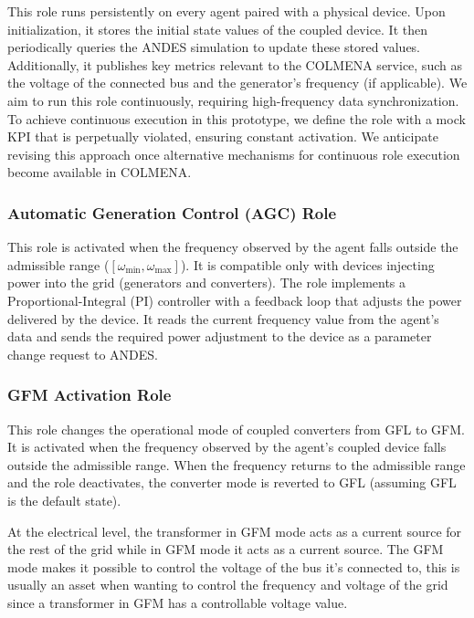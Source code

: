 \documentclass{article}
\begin{document}
This role runs persistently on every agent paired with a physical device. Upon initialization, it stores the initial state values of the coupled device. It then periodically queries the ANDES simulation to update these stored values. Additionally, it publishes key metrics relevant to the COLMENA service, such as the voltage of the connected bus and the generator's frequency (if applicable). We aim to run this role continuously, requiring high-frequency data synchronization. To achieve continuous execution in this prototype, we define the role with a mock KPI that is perpetually violated, ensuring constant activation. We anticipate revising this approach once alternative mechanisms for continuous role execution become available in COLMENA.

\subsubsection*{Automatic Generation Control (AGC) Role}

This role is activated when the frequency observed by the agent falls outside the admissible range ($[\omega_{\min}, \omega_{\max}]$). It is compatible only with devices injecting power into the grid (generators and converters). The role implements a Proportional-Integral (PI) controller with a feedback loop that adjusts the power delivered by the device. It reads the current frequency value from the agent's data and sends the required power adjustment to the device as a parameter change request to ANDES. 



\subsubsection*{GFM Activation Role}

This role changes the operational mode of coupled converters from GFL to GFM. It is activated when the frequency observed by the agent's coupled device falls outside the admissible range. When the frequency returns to the admissible range and the role deactivates, the converter mode is reverted to GFL (assuming GFL is the default state).

At the electrical level, the transformer in GFM mode acts as a current source for the rest of the grid while in GFM mode it acts as a current source. The GFM mode makes it possible to control the voltage of the bus it's connected to, this is usually an asset when wanting to control the frequency and voltage of the grid since a transformer in GFM has a controllable voltage value. 
\end{document}
